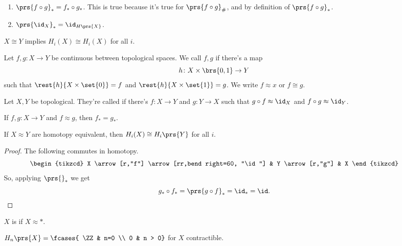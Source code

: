 \documentclass[10pt,a4paper,twoside,openany,hidelinks]{book}
\begin{document}
\begin{remark}
\begin{enumerate}
\item $\prs{f \circ g}_{*} = f_{*} \circ g_{*}$. This is true because it's true for $\prs{f \circ g}_{\#}$, and by definition of $\prs{f \circ g}_{*}$.
\item $\prs{\id_X}_{*} = \id_{H\prs{X}}$.
\end{enumerate}
\end{remark}
\begin{corollary}
$X\cong Y$ implies $H_{i}(X) \cong H_{i}(X)$ for all $i$.
\end{corollary}
\begin{definition}
Let $f,g \colon X \to Y$ be continuous between topological spaces.
We call $f,g$  if there's a map
\[h \colon X \times \brs{0,1} \to Y\]
such that $\rest{h}{X \times \set{0}} = f$ and $\rest{h}{X \times \set{1}} = g$.
We write $f \approx x$ or $f \cong g$.
\end{definition}
\begin{definition}
Let $X,Y$ be topological. They're called  if there's $f \colon X \to Y$ and $g \colon Y \to X$ such that $g \circ f \approx \id_X$ and $f \circ g \approx \id_Y$.
\end{definition}
\begin{proposition}
If $f,g \colon X \to Y$ and $f \approx g$, then $f_{*} = g_{*}$.
\end{proposition}
\begin{corollary}
If $X \approx Y$ are homotopy equivalent, then $H_i(X) \cong H_i\prs{Y}$ for all $i$.
\end{corollary}
\begin{proof}
The following commutes in homotopy.
\[
\begin{tikzcd}
X \arrow[r,"f"] \arrow[rr,bend right=60, "\id"] & Y \arrow[r,"g"] & X
\end{tikzcd}
\]
So, applying $\prs{}_{*}$ we get
\[g_{*} \circ f_{*} = \prs{g\circ f}_{*} = \id_{*} = \id\text{.}\]
\end{proof}
\begin{definition}
$X$ is  if $X \approx *$.
\end{definition}
\begin{corollary}
$H_n\prs{X} = \fcases{ \ZZ & n=0 \\ 0 & n > 0}$ for $X$ contractible.
\end{corollary}
\end{document}
